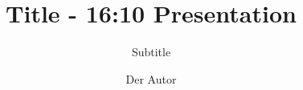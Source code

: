 
\title{Title - 16:10 Presentation}              %
\subtitle{Subtitle}                             %
\author{Der Autor}                              %
\newcommand{\myId}{123456}                      %
\newcommand{\mySemester}{Sommersemester 2020}   %
\newcommand{\myTime}{\today}                    %
\newcommand{\myModule}{Modulname}               %
\newcommand{\myEmail}{meine.email@stud.h-da.de} %